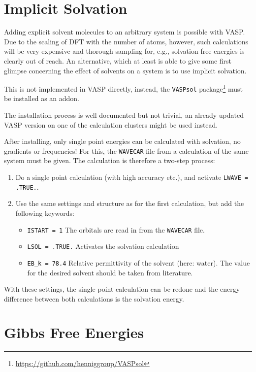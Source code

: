 \documentclass[a4paper,11pt]{article}
\begin{document}
\section{Implicit Solvation}

Adding explicit solvent molecules to an arbitrary system is possible with VASP.
Due to the scaling of DFT with the number of atoms, however, such calculations
will be very expensive and thorough sampling for, e.g., solvation free energies
is clearly out of reach.
An alternative, which at least is able to give some first glimpse concerning the
effect of solvents on a system is to use implicit solvation.

This is not implemented in VASP directly, instead, the \texttt{VASPsol}
package\footnote{\url{https://github.com/henniggroup/VASPsol}}
must be installed as an addon.

The installation process is well documented but not trivial, an already updated
VASP version on one of the calculation clusters might be used instead.

After installing, only single point energies can be calculated with solvation, no
gradients or frequencies!
For this, the \texttt{WAVECAR} file from a calculation of the same system must be
given. The calculation is therefore a two-step process:

\begin{enumerate}
 \item Do a single point calculation (with high accuracy etc.), and activate
 \texttt{LWAVE = .TRUE.}.
 \item Use the same settings and structure as for the first calculation, but add the
 following keywords:
 \begin{itemize}
  \item \texttt{ISTART = 1} The orbitals are read in from the \texttt{WAVECAR} file.
  \item \texttt{LSOL = .TRUE.} Activates the solvation calculation
  \item \texttt{EB\_k = 78.4} Relative permittivity of the solvent (here: water). The value
  for the desired solvent should be taken from literature.
 \end{itemize}

\end{enumerate}

 With these settings, the single point calculation can be redone and the energy difference
 between both calculations is the solvation energy.


 \section{Gibbs Free Energies}
\end{document}
